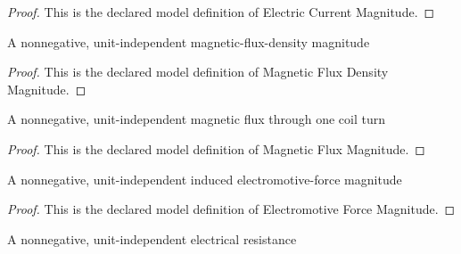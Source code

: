 \begin{proof}
  This is the declared model definition of Electric Current Magnitude.
\end{proof}
\begin{definition}
  \label{def:physics:phyx-mini-0980:phyxminiproblems-problemphyxmini0980-magneticfluxdensitymagnitude}
  A nonnegative, unit-independent magnetic-flux-density magnitude
\end{definition}
\begin{proof}
  This is the declared model definition of Magnetic Flux Density Magnitude.
\end{proof}
\begin{definition}
  \label{def:physics:phyx-mini-0980:phyxminiproblems-problemphyxmini0980-magneticfluxmagnitude}
  A nonnegative, unit-independent magnetic flux through one coil turn
\end{definition}
\begin{proof}
  This is the declared model definition of Magnetic Flux Magnitude.
\end{proof}
\begin{definition}
  \label{def:physics:phyx-mini-0980:phyxminiproblems-problemphyxmini0980-electromotiveforcemagnitude}
  A nonnegative, unit-independent induced electromotive-force magnitude
\end{definition}
\begin{proof}
  This is the declared model definition of Electromotive Force Magnitude.
\end{proof}
\begin{definition}
  \label{def:physics:phyx-mini-0980:phyxminiproblems-problemphyxmini0980-electricalresistancemagnitude}
  A nonnegative, unit-independent electrical resistance
\end{definition}

